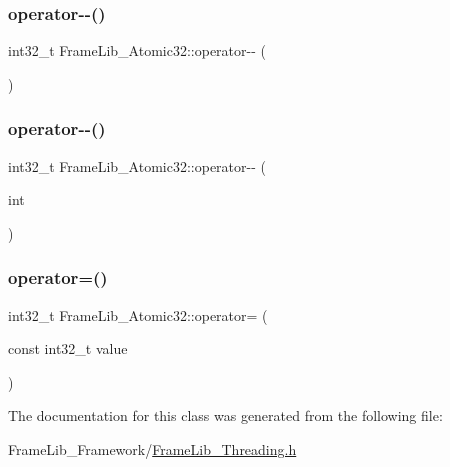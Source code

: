 \mbox{\label{class_frame_lib___atomic32_aebb48565023d6cefbaa9bacd797dd9e2}} 
\subsubsection{\texorpdfstring{operator-\/-\/()}{operator--()}\hspace{0.1cm}{\footnotesize\ttfamily [1/2]}}
{\footnotesize\ttfamily int32\+\_\+t Frame\+Lib\+\_\+\+Atomic32\+::operator-\/-\/ (\begin{DoxyParamCaption}{ }\end{DoxyParamCaption})\hspace{0.3cm}{\ttfamily [inline]}}

\mbox{\label{class_frame_lib___atomic32_af3cc1d2db25b8e693d2250f7fcd78abc}} 
\subsubsection{\texorpdfstring{operator-\/-\/()}{operator--()}\hspace{0.1cm}{\footnotesize\ttfamily [2/2]}}
{\footnotesize\ttfamily int32\+\_\+t Frame\+Lib\+\_\+\+Atomic32\+::operator-\/-\/ (\begin{DoxyParamCaption}\item[{int}]{ }\end{DoxyParamCaption})\hspace{0.3cm}{\ttfamily [inline]}}

\mbox{\label{class_frame_lib___atomic32_ac7565158777f53ff5e859f190b80648f}} 
\subsubsection{\texorpdfstring{operator=()}{operator=()}}
{\footnotesize\ttfamily int32\+\_\+t Frame\+Lib\+\_\+\+Atomic32\+::operator= (\begin{DoxyParamCaption}\item[{const int32\+\_\+t}]{value }\end{DoxyParamCaption})\hspace{0.3cm}{\ttfamily [inline]}}



The documentation for this class was generated from the following file\+:\begin{DoxyCompactItemize}
\item 
Frame\+Lib\+\_\+\+Framework/\hyperlink{_frame_lib___threading_8h}{Frame\+Lib\+\_\+\+Threading.\+h}\end{DoxyCompactItemize}
